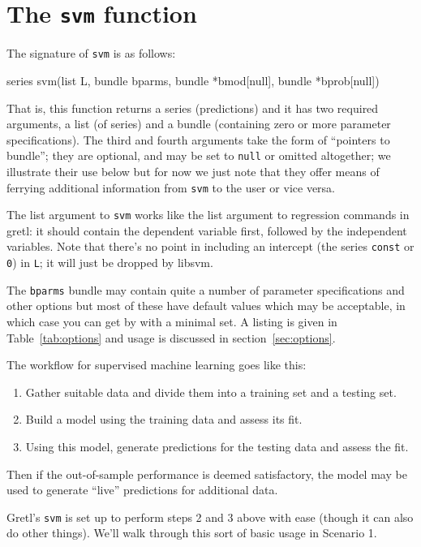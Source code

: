 \documentclass{article}
\begin{document}
\section{The \texttt{svm} function}
\label{sec:function}

The signature of \texttt{svm} is as follows:
\begin{code}
series svm(list L, bundle bparms, bundle *bmod[null], bundle *bprob[null])
\end{code}
That is, this function returns a series (predictions) and it has two
required arguments, a list (of series) and a bundle (containing zero
or more parameter specifications). The third and fourth arguments take
the form of ``pointers to bundle''; they are optional, and may be set
to \texttt{null} or omitted altogether; we illustrate their use below
but for now we just note that they offer means of ferrying additional
information from \texttt{svm} to the user or vice versa.

The list argument to \texttt{svm} works like the list argument to
regression commands in gretl: it should contain the dependent variable
first, followed by the independent variables. Note that there's no
point in including an intercept (the series \texttt{const} or
\texttt{0}) in \texttt{L}; it will just be dropped by \textsf{libsvm}.

The \texttt{bparms} bundle may contain quite a number of parameter
specifications and other options but most of these have default
values which may be acceptable, in which case you can get by with a
minimal set.  A listing is given in Table~\ref{tab:options} and usage
is discussed in section~\ref{sec:options}.

The workflow for supervised machine learning goes like this:
\begin{enumerate}
\item Gather suitable data and divide them into a training set and a
  testing set.
\item Build a model using the training data and assess its fit.
\item Using this model, generate predictions for the testing data and
  assess the fit.
\end{enumerate}

Then if the out-of-sample performance is deemed satisfactory, the
model may be used to generate ``live'' predictions for additional
data.

Gretl's \texttt{svm} is set up to perform steps 2 and 3 above with
ease (though it can also do other things). We'll walk through this
sort of basic usage in Scenario 1.
\end{document}
